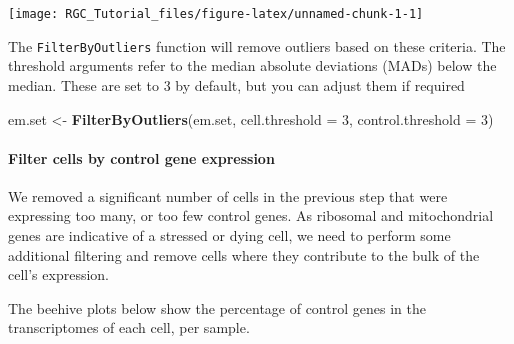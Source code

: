 \documentclass[]{article}
\newenvironment{Shaded}{\begin{snugshade}}{\end{snugshade}}
\newcommand{\DataTypeTok}[1]{\textcolor[rgb]{0.13,0.29,0.53}{#1}}
\newcommand{\DecValTok}[1]{\textcolor[rgb]{0.00,0.00,0.81}{#1}}
\newcommand{\KeywordTok}[1]{\textcolor[rgb]{0.13,0.29,0.53}{\textbf{#1}}}
\newcommand{\NormalTok}[1]{#1}
\newcommand{\OperatorTok}[1]{\textcolor[rgb]{0.81,0.36,0.00}{\textbf{#1}}}
\newcommand{\StringTok}[1]{\textcolor[rgb]{0.31,0.60,0.02}{#1}}
\let\oldparagraph\paragraph
\renewcommand{\paragraph}[1]{\oldparagraph{#1}\mbox{}}
\begin{document}
\begin{Shaded}
\end{Shaded}

\begin{center}\texttt{[image: RGC\_Tutorial\_files/figure-latex/unnamed-chunk-1-1]} \end{center}

The \texttt{FilterByOutliers} function will remove outliers based on
these criteria. The threshold arguments refer to the median absolute
deviations (MADs) below the median. These are set to 3 by default, but
you can adjust them if required

\begin{Shaded}
\begin{Highlighting}[]
\NormalTok{em.set <-}\StringTok{ }\KeywordTok{FilterByOutliers}\NormalTok{(em.set, }\DataTypeTok{cell.threshold =} \DecValTok{3}\NormalTok{, }\DataTypeTok{control.threshold =} \DecValTok{3}\NormalTok{)}
\end{Highlighting}
\end{Shaded}

\hypertarget{filter-cells-by-control-gene-expression}{%
\paragraph{Filter cells by control gene
expression}\label{filter-cells-by-control-gene-expression}}

We removed a significant number of cells in the previous step that were
expressing too many, or too few control genes. As ribosomal and
mitochondrial genes are indicative of a stressed or dying cell, we need
to perform some additional filtering and remove cells where they
contribute to the bulk of the cell's expression.

The beehive plots below show the percentage of control genes in the
transcriptomes of each cell, per sample.

\begin{Shaded}
\end{Shaded}
\end{document}
